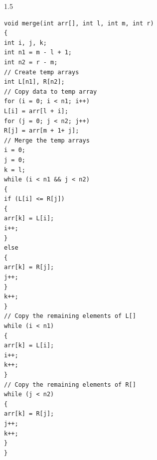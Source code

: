 \begin{spacing}{1.5}
\begin{enumerate}
\begin{verbatim}
void merge(int arr[], int l, int m, int r)
{
int i, j, k;
int n1 = m - l + 1;
int n2 = r - m;
// Create temp arrays
int L[n1], R[n2];
// Copy data to temp array
for (i = 0; i < n1; i++)
L[i] = arr[l + i];
for (j = 0; j < n2; j++)
R[j] = arr[m + 1+ j];
// Merge the temp arrays
i = 0;
j = 0;
k = l;
while (i < n1 && j < n2)
{
if (L[i] <= R[j])
{
arr[k] = L[i];
i++;
}
else
{
arr[k] = R[j];
j++;
}
k++;
}
// Copy the remaining elements of L[]
while (i < n1)
{
arr[k] = L[i];
i++;
k++;
}
// Copy the remaining elements of R[]
while (j < n2)
{
arr[k] = R[j];
j++;
k++;
}
}
\end{verbatim}
\end{enumerate}
\end{spacing}
